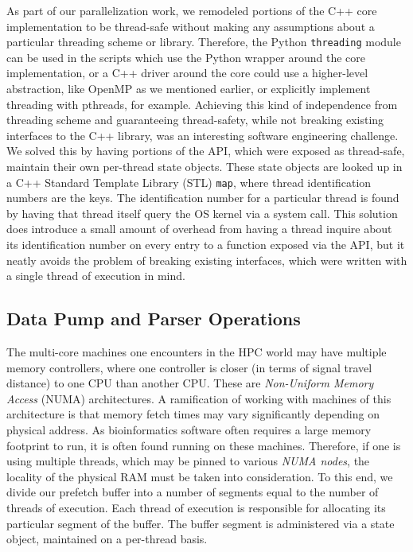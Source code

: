 \documentclass{article}
\begin{document}
As part of our parallelization work, we remodeled portions of the C++ core implementation to be thread-safe without making any assumptions about a particular threading scheme or library. Therefore, the Python \texttt{threading} module can be used in the scripts which use the Python wrapper around the core implementation, or a C++ driver around the core could use a higher-level abstraction, like OpenMP as we mentioned earlier, or explicitly implement threading with pthreads, for example. Achieving this kind of independence from threading scheme and guaranteeing thread-safety, while not breaking existing interfaces to the C++ library, was an interesting software engineering challenge. We solved this by having portions of the API, which were exposed as thread-safe, maintain their own per-thread state objects. These state objects are looked up in a C++ Standard Template Library (STL) \texttt{map}, where thread identification numbers are the keys. The identification number for a particular thread is found by having that thread itself query the OS kernel via a system call. This solution does introduce a small amount of overhead from having a thread inquire about its identification number on every entry to a function exposed via the API, but it neatly avoids the problem of breaking existing interfaces, which were written with a single thread of execution in mind.

\subsection{Data Pump and Parser Operations}

The multi-core machines one encounters in the HPC world may have multiple memory controllers, where one controller is closer (in terms of signal travel distance) to one CPU than another CPU. These are \textit{Non-Uniform Memory Access} (NUMA) architectures. A ramification of working with machines of this architecture is that memory fetch times may vary significantly depending on physical address. As bioinformatics software often requires a large memory footprint to run, it is often found running on these machines. Therefore, if one is using multiple threads, which may be pinned to various \textit{NUMA nodes}, the locality of the physical RAM must be taken into consideration. To this end, we divide our prefetch buffer into a number of segments equal to the number of threads of execution. Each thread of execution is responsible for allocating its particular segment of the buffer. The buffer segment is administered via a state object, maintained on a per-thread basis.
\end{document}
